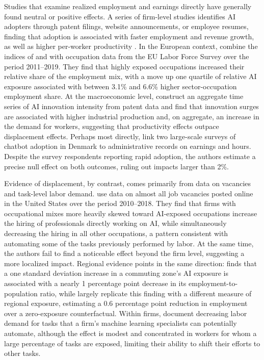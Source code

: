 \documentclass[11pt]{article}
\begin{document}
Studies that examine realized employment and earnings directly have generally found neutral or positive effects. A series of firm-level studies identifies AI adopters through patent filings, website announcements, or employee resumes, finding that adoption is associated with faster employment and revenue growth, as well as higher per-worker productivity \citep{oecdreport2022, Alderucci2019QuantifyingTI, BABINA2024103745}. In the European context, \citet{albanesi2023newshares} combine the indices of \citet{felten_how_2023} and \citet{webb_impact_2022} with occupation data from the EU Labor Force Survey over the period 2011--2019. They find that highly exposed occupations increased their relative share of the employment mix, with a move up one quartile of relative AI exposure associated with between 3.1\% and 6.6\% higher sector-occupation employment share. At the macroeconomic level, \citet{gazzani2024tsonai} construct an aggregate time series of AI innovation intensity from patent data and find that innovation surges are associated with higher industrial production and, on aggregate, an increase in the demand for workers, suggesting that productivity effects outpace displacement effects. Perhaps most directly, \citet{humlum2025stillwaters} link two large-scale surveys of chatbot adoption in Denmark to administrative records on earnings and hours. Despite the survey respondents reporting rapid adoption, the authors estimate a precise null effect on both outcomes, ruling out impacts larger than 2\%.

Evidence of displacement, by contrast, comes primarily from data on vacancies and task-level labor demand. \citet{acemoglu_restrepo_2022} use data on almost all job vacancies posted online in the United States over the period 2010--2018. They find that firms with occupational mixes more heavily skewed toward AI-exposed occupations increase the hiring of professionals directly working on AI, while simultaneously decreasing the hiring in all other occupations, a pattern consistent with automating some of the tasks previously performed by labor. At the same time, the authors fail to find a noticeable effect beyond the firm level, suggesting a more localized impact. Regional evidence points in the same direction: \citet{Huang2024} finds that a one standard deviation increase in a commuting zone's AI exposure is associated with a nearly 1 percentage point decrease in its employment-to-population ratio, while \citet{bonfiglioli2024aiczgrowth} largely replicate this finding with a different measure of regional exposure, estimating a 0.6 percentage point reduction in employment over a zero-exposure counterfactual. Within firms, \citet{hampole2025artificial} document decreasing labor demand for tasks that a firm's machine learning specialists can potentially automate, although the effect is modest and concentrated in workers for whom a large percentage of tasks are exposed, limiting their ability to shift their efforts to other tasks.
\end{document}
